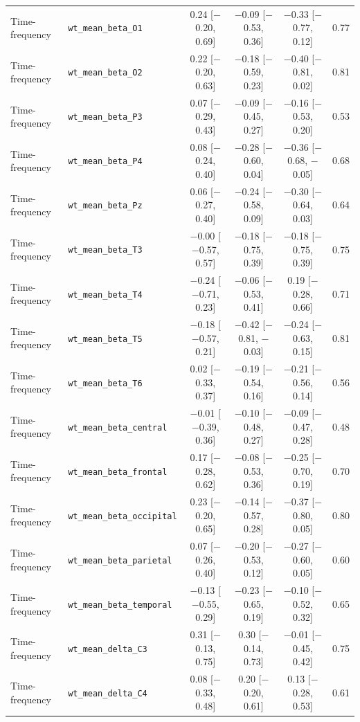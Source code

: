 {\begin{longtable}{llcccc}
Time-frequency & \texttt{wt\_mean\_beta\_O1} & 0.24 [$-$0.20, 0.69] & $-$0.09 [$-$0.53, 0.36] & $-$0.33 [$-$0.77, 0.12] & 0.77 \\
Time-frequency & \texttt{wt\_mean\_beta\_O2} & 0.22 [$-$0.20, 0.63] & $-$0.18 [$-$0.59, 0.23] & $-$0.40 [$-$0.81, 0.02] & 0.81 \\
Time-frequency & \texttt{wt\_mean\_beta\_P3} & 0.07 [$-$0.29, 0.43] & $-$0.09 [$-$0.45, 0.27] & $-$0.16 [$-$0.53, 0.20] & 0.53 \\
Time-frequency & \texttt{wt\_mean\_beta\_P4} & 0.08 [$-$0.24, 0.40] & $-$0.28 [$-$0.60, 0.04] & $-$0.36 [$-$0.68, $-$0.05] & 0.68 \\
Time-frequency & \texttt{wt\_mean\_beta\_Pz} & 0.06 [$-$0.27, 0.40] & $-$0.24 [$-$0.58, 0.09] & $-$0.30 [$-$0.64, 0.03] & 0.64 \\
Time-frequency & \texttt{wt\_mean\_beta\_T3} & $-$0.00 [$-$0.57, 0.57] & $-$0.18 [$-$0.75, 0.39] & $-$0.18 [$-$0.75, 0.39] & 0.75 \\
Time-frequency & \texttt{wt\_mean\_beta\_T4} & $-$0.24 [$-$0.71, 0.23] & $-$0.06 [$-$0.53, 0.41] & 0.19 [$-$0.28, 0.66] & 0.71 \\
Time-frequency & \texttt{wt\_mean\_beta\_T5} & $-$0.18 [$-$0.57, 0.21] & $-$0.42 [$-$0.81, $-$0.03] & $-$0.24 [$-$0.63, 0.15] & 0.81 \\
Time-frequency & \texttt{wt\_mean\_beta\_T6} & 0.02 [$-$0.33, 0.37] & $-$0.19 [$-$0.54, 0.16] & $-$0.21 [$-$0.56, 0.14] & 0.56 \\
Time-frequency & \texttt{wt\_mean\_beta\_central} & $-$0.01 [$-$0.39, 0.36] & $-$0.10 [$-$0.48, 0.27] & $-$0.09 [$-$0.47, 0.28] & 0.48 \\
Time-frequency & \texttt{wt\_mean\_beta\_frontal} & 0.17 [$-$0.28, 0.62] & $-$0.08 [$-$0.53, 0.36] & $-$0.25 [$-$0.70, 0.19] & 0.70 \\
Time-frequency & \texttt{wt\_mean\_beta\_occipital} & 0.23 [$-$0.20, 0.65] & $-$0.14 [$-$0.57, 0.28] & $-$0.37 [$-$0.80, 0.05] & 0.80 \\
Time-frequency & \texttt{wt\_mean\_beta\_parietal} & 0.07 [$-$0.26, 0.40] & $-$0.20 [$-$0.53, 0.12] & $-$0.27 [$-$0.60, 0.05] & 0.60 \\
Time-frequency & \texttt{wt\_mean\_beta\_temporal} & $-$0.13 [$-$0.55, 0.29] & $-$0.23 [$-$0.65, 0.19] & $-$0.10 [$-$0.52, 0.32] & 0.65 \\
Time-frequency & \texttt{wt\_mean\_delta\_C3} & 0.31 [$-$0.13, 0.75] & 0.30 [$-$0.14, 0.73] & $-$0.01 [$-$0.45, 0.42] & 0.75 \\
Time-frequency & \texttt{wt\_mean\_delta\_C4} & 0.08 [$-$0.33, 0.48] & 0.20 [$-$0.20, 0.61] & 0.13 [$-$0.28, 0.53] & 0.61 \\

\end{longtable}}
